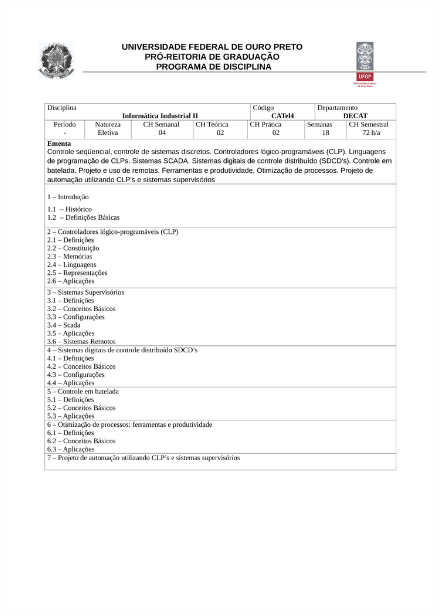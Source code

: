 \begin{figure}[p]
	\centering 
	\includegraphics[scale=0.7]{capitulos/anexo1-programas-disciplina/eg24.pdf}
\end{figure}

